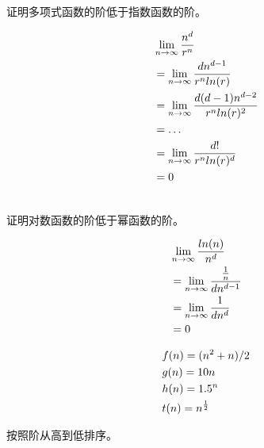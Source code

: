 证明多项式函数的阶低于指数函数的阶。

\vspace{-0.5cm}

\begin{align*}
     & \lim\limits_{n \rightarrow \infty} {n^d \over r^n}                    \\
     & = \lim\limits_{n \rightarrow \infty} {dn^{d-1} \over r^nln(r)}        \\
     & = \lim\limits_{n \rightarrow \infty} {d(d-1)n^{d-2} \over r^nln(r)^2} \\
     & = \dots                                                               \\
     & = \lim\limits_{n \rightarrow \infty} {d! \over r^nln(r)^d}            \\
     & = 0
\end{align*}

\vspace{0.5cm}

 \\

证明对数函数的阶低于幂函数的阶。

\vspace{-0.5cm}

\begin{align*}
     & \lim\limits_{n \rightarrow \infty} {ln(n) \over n^d}              \\
     & = \lim\limits_{n \rightarrow \infty} {{1 \over n} \over dn^{d-1}} \\
     & = \lim\limits_{n \rightarrow \infty} {1 \over dn^d}               \\
     & = 0
\end{align*}

\vspace{0.5cm}


\vspace{-0.5cm}

\begin{align*}
     & f(n) = (n^2 + n) / 2 \\
     & g(n) = 10n           \\
     & h(n) = 1.5^n         \\
     & t(n) = n^{1 \over 2}
\end{align*}

按照阶从高到低排序。

\vspace{-0.5cm}

